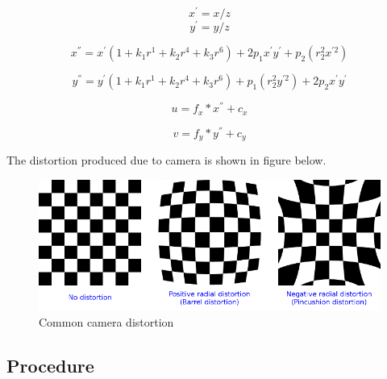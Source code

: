 \documentclass[12pt, a4paper, font = Times New Roman]{article}
\begin{document}
\begin{equation}\label{eq:4}
x^{'} = x/z
\end{equation}
\begin{equation}\label{eq:5}
y^{'} = y/z
\end{equation}

\begin{equation}\label{eq:6}
x^{''} = x^{'}(1+k_1r^1+k_2r^4+k_3r^6) + 2p_1x^{'}y^{'}+ p_2(r^2_2x^{'2})
\end{equation}

\begin{equation}\label{eq:7}
y^{''} = y^{'}(1+k_1r^1+k_2r^4+k_3r^6) + p_1(r^2_2y^{'2})+ 2p_2x^{'}y^{'}
\end{equation}

\begin{equation}\label{eq:8}
u = f_x * x^{''} + c_x
\end{equation}

\begin{equation}\label{eq:9}
v = f_y * y^{''} + c_y
\end{equation}

\vspace{2cm}
The distortion produced due to camera is shown in figure below.


\begin{figure}[H]
\includegraphics[scale=0.5]{distortion_examples.png}
\caption{Common camera distortion}
\label{fig:distortion}
\end{figure}

\vspace{2cm}

\subsection{Procedure}
\end{document}
